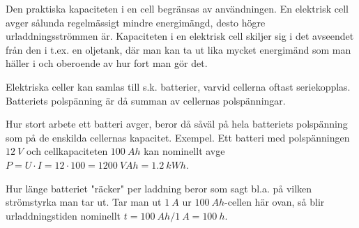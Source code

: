 Den praktiska kapaciteten i en cell begränsas av användningen. En elektrisk cell
avger sålunda regelmässigt mindre energimängd, desto högre urladdningsströmmen
är. Kapaciteten i en elektrisk cell skiljer sig i det avseendet från den i
t.ex. en oljetank, där man kan ta ut lika mycket energimänd som man häller i
och oberoende av hur fort man gör det.

Elektriska celler kan samlas till s.k. batterier, varvid cellerna oftast
seriekopplas.
Batteriets polspänning är då summan av cellernas polspänningar.

Hur stort arbete ett batteri avger, beror då såväl på hela batteriets
polspänning som på de enskilda cellernas kapacitet.
Exempel.
Ett batteri med polspänningen \(12\ V\) och cellkapaciteten \(100\ Ah\) kan
nominellt avge
\(P = U \cdot I = 12 \cdot 100 = 1200\ VAh = 1.2\ kWh\).

Hur länge batteriet "räcker" per laddning beror som sagt bl.a. på vilken
strömstyrka man tar ut. Tar man ut \(1\ A\) ur \(100\ Ah\)-cellen här ovan, så
blir urladdningstiden nominellt \(t = 100\ Ah/1\ A = 100\ h\).
